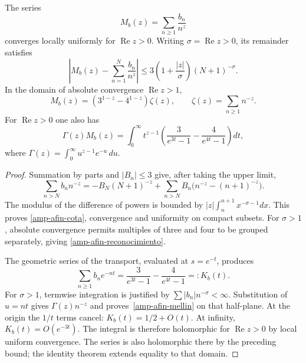 \begin{theorem}
\label{amp-afin-thm-momentos}
The series
\begin{equation}
 M_b(z)=\sum_{n\geq1}\frac{b_n}{n^z}
 \label{amp-afin-momento}
\end{equation}
converges locally uniformly for $\operatorname{Re}z>0$.
Writing $\sigma=\operatorname{Re}z>0$, its remainder satisfies
\begin{equation}
 \left|M_b(z)-\sum_{n=1}^{N}\frac{b_n}{n^z}\right|
 \leq3\left(1+\frac{|z|}{\sigma}\right)(N+1)^{-\sigma}.
 \label{amp-afin-cota}
\end{equation}
In the domain of absolute convergence $\operatorname{Re}z>1$,
\begin{equation}
 M_b(z)=(3^{1-z}-4^{1-z})\zeta(z),\qquad
 \zeta(z)=\sum_{n\geq1}n^{-z}.
 \label{amp-afin-reconocimiento}
\end{equation}
For $\operatorname{Re}z>0$ one also has
\begin{equation}
 \Gamma(z)M_b(z)=
 \int_0^\infty t^{z-1}
 \left(\frac3{e^{3t}-1}-\frac4{e^{4t}-1}\right)dt,
 \label{amp-afin-mellin}
\end{equation}
where $\Gamma(z)=\int_0^\infty u^{z-1}e^{-u}\,du$.
\end{theorem}
\begin{proof}
Summation by parts and $|B_n|\leq3$ give, after taking the upper limit,
\[
 \sum_{n>N}b_n n^{-z}
 =-B_N(N+1)^{-z}
   +\sum_{n>N}B_n\bigl(n^{-z}-(n+1)^{-z}\bigr).
\]
The modulus of the difference of powers is bounded by
$|z|\int_n^{n+1}x^{-\sigma-1}dx$. This proves
\eqref{amp-afin-cota}, convergence and uniformity on compact subsets.
For $\sigma>1$, absolute convergence permits multiples of three
and four to be grouped separately, giving
\eqref{amp-afin-reconocimiento}.

The geometric series of the transport, evaluated at $s=e^{-t}$,
produces
\[
 \sum_{n\geq1}b_n e^{-nt}
 =\frac3{e^{3t}-1}-\frac4{e^{4t}-1}=:K_b(t).
\]
For $\sigma>1$, termwise integration is justified by
$\sum|b_n|n^{-\sigma}<\infty$. Substitution of $u=nt$ gives
$\Gamma(z)n^{-z}$ and proves~\eqref{amp-afin-mellin} on that
half-plane. At the origin the $1/t$ terms cancel:
$K_b(t)=1/2+O(t)$. At infinity, $K_b(t)=O(e^{-3t})$.
The integral is therefore holomorphic for $\operatorname{Re}z>0$
by local uniform convergence. The series is also holomorphic there
by the preceding bound; the identity theorem extends equality
to that domain.
\end{proof}


